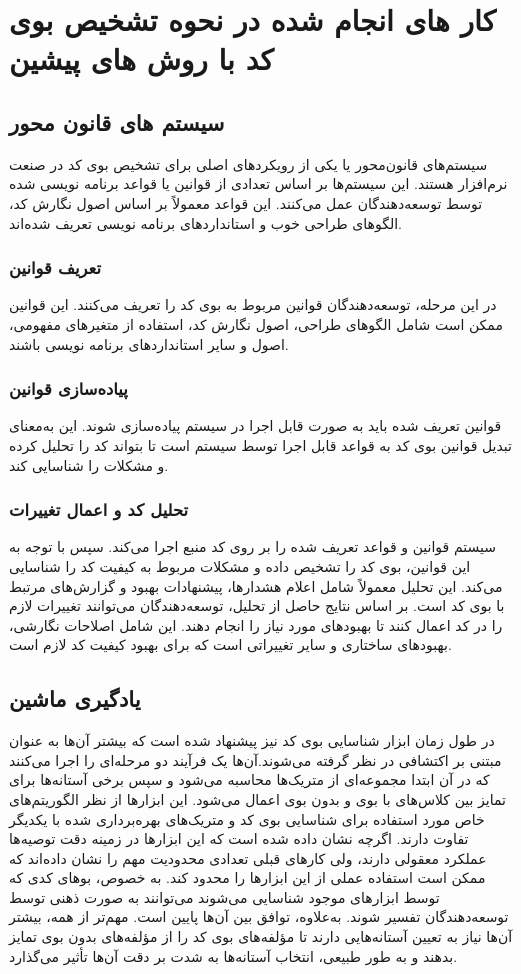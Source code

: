 \clearpage
\section[کار های انجام شده در نحوه تشخیص بوی کد با روش های پیشین]{کار های انجام شده در نحوه تشخیص بوی کد با روش های پیشین} 
\subsection{سیستم های قانون محور}
سیستم‌های قانون‌محور یا  یکی از رویکردهای اصلی برای تشخیص بوی کد در صنعت نرم‌افزار هستند. این سیستم‌ها بر اساس تعدادی از قوانین یا قواعد برنامه نویسی شده توسط توسعه‌دهندگان عمل می‌کنند. این قواعد معمولاً بر اساس اصول نگارش کد، الگوهای طراحی خوب و استانداردهای برنامه نویسی تعریف شده‌اند.
\subsubsection{تعریف قوانین}
در این مرحله، توسعه‌دهندگان قوانین مربوط به بوی کد را تعریف می‌کنند. این قوانین ممکن است شامل الگوهای طراحی، اصول نگارش کد، استفاده از متغیرهای مفهومی، اصول  و سایر استانداردهای برنامه نویسی باشند.
\subsubsection{پیاده‌سازی قوانین}
قوانین تعریف شده باید به صورت قابل اجرا در سیستم پیاده‌سازی شوند. این به‌معنای تبدیل قوانین بوی کد به قواعد قابل اجرا توسط سیستم است تا بتواند کد را تحلیل کرده و مشکلات را شناسایی کند.
\subsubsection{تحلیل کد و اعمال تغییرات}
سیستم قوانین و قواعد تعریف شده را بر روی کد منبع اجرا می‌کند. سپس با توجه به این قوانین، بوی کد را تشخیص داده و مشکلات مربوط به کیفیت کد را شناسایی می‌کند. این تحلیل معمولاً شامل اعلام هشدارها، پیشنهادات بهبود و گزارش‌های مرتبط با بوی کد است.
بر اساس نتایج حاصل از تحلیل، توسعه‌دهندگان می‌توانند تغییرات لازم را در کد اعمال کنند تا بهبودهای مورد نیاز را انجام دهند. این شامل اصلاحات نگارشی، بهبودهای ساختاری و سایر تغییراتی است که برای بهبود کیفیت کد لازم است.
\subsection{یادگیری ماشین}
در طول زمان ابزار شناسایی بوی کد نیز پیشنهاد شده است که بیشتر آن‌ها به عنوان مبتنی بر اکتشافی در نظر گرفته می‌شوند.آن‌ها یک فرآیند دو مرحله‌ای را اجرا می‌کنند که در آن ابتدا مجموعه‌ای از متریک‌ها محاسبه می‌شود و سپس برخی آستانه‌ها برای تمایز بین کلاس‌های با بوی و بدون بوی اعمال می‌شود. این ابزارها از نظر الگوریتم‌های خاص مورد استفاده برای شناسایی بوی کد و متریک‌های بهره‌برداری شده با یکدیگر تفاوت دارند. اگرچه نشان داده شده است که این ابزارها در زمینه دقت توصیه‌ها عملکرد معقولی دارند، ولی کارهای قبلی تعدادی محدودیت مهم را نشان داده‌اند که ممکن است استفاده عملی از این ابزارها را محدود کند. به خصوص، بوهای کدی که توسط ابزارهای موجود شناسایی می‌شوند می‌توانند به صورت ذهنی توسط توسعه‌دهندگان تفسیر شوند. به‌علاوه، توافق بین آن‌ها پایین است. مهم‌تر از همه، بیشتر آن‌ها نیاز به تعیین آستانه‌هایی دارند تا مؤلفه‌های بوی کد را از مؤلفه‌های بدون بوی تمایز بدهند و به طور طبیعی، انتخاب آستانه‌ها به شدت بر دقت آن‌ها تأثیر می‌گذارد.

